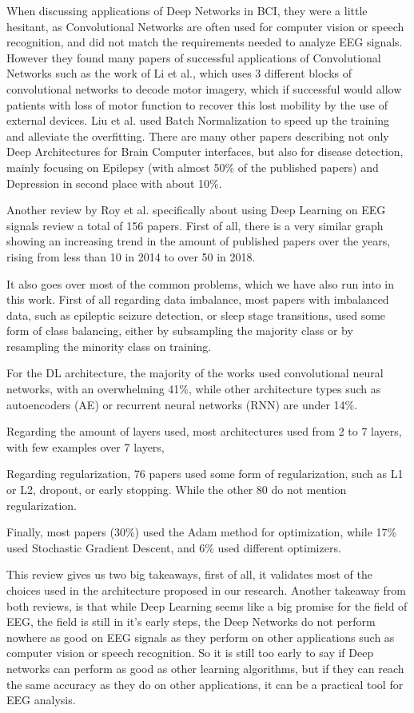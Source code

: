 \documentclass[conference]{IEEEtran}
\begin{document}
When discussing applications of Deep Networks in BCI, they were a little hesitant, as Convolutional Networks are often used for computer vision or speech recognition, and did not match the requirements needed to analyze EEG signals. However they found many papers of successful applications of Convolutional Networks such as the work of Li et al.\cite{LI8709723}, which uses 3 different blocks of convolutional networks to decode motor imagery, which if successful would allow patients with loss of motor function to recover this lost mobility by the use of external devices. Liu et al. \cite{LIU2018288} used Batch Normalization to speed up the training and alleviate the overfitting. There are many other papers describing not only Deep Architectures for Brain Computer interfaces, but also for disease detection, mainly focusing on Epilepsy (with almost  50\% of the published papers) and Depression in second place with about 10\%.

Another review by Roy et al.\cite{RoyReview} specifically about using Deep Learning on EEG signals review a total of 156 papers. First of all, there is a very similar graph showing an increasing trend in the amount of published papers over the years, rising from less than 10 in 2014 to over 50 in 2018.


It also goes over most of the common problems, which we have also run into in this work. First of all regarding data imbalance, most papers with imbalanced data, such as epileptic seizure detection, or sleep stage transitions, used some form of class balancing, either by subsampling the majority class or by resampling the minority class on training.

For the DL architecture, the majority of the works used convolutional neural networks, with an overwhelming 41\%, while other architecture types such as autoencoders (AE) or recurrent neural networks (RNN) are under 14\%.

Regarding the amount of layers used, most architectures used from 2 to 7 layers, with  few examples over 7 layers,

Regarding regularization, 76 papers used some form of regularization, such as L1 or L2, dropout, or early stopping. While the other 80 do not mention regularization.

Finally, most papers (30\%) used the Adam method for optimization, while 17\% used Stochastic Gradient Descent, and 6\% used different optimizers.

This review gives us two big takeaways, first of all, it validates most of the choices used in the architecture proposed in our research. 
Another takeaway from both reviews, is that while Deep Learning seems like a big promise for the field of EEG, the field is still in it's early steps, the Deep Networks do not perform nowhere as good on EEG signals as they perform on other applications such as computer vision  or speech recognition. So it is still too early to say if Deep networks can perform as good as other learning algorithms, but if they can reach the same accuracy as they do on other applications, it can be a practical tool for EEG analysis.
\end{document}
